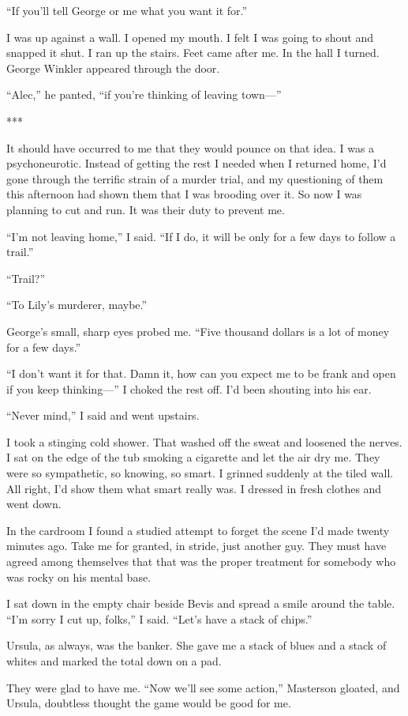 \documentclass{novel}
\begin{document}
“If you’ll tell George or me what you want it for.”

I was up against a wall. I opened my mouth. I felt I was going to shout and snapped it shut. I ran up the stairs. Feet came after me. In the hall I turned. George Winkler appeared through the door.

“Alec,” he panted, “if you’re thinking of leaving town—”

***

It should have occurred to me that they would pounce on that idea. I was a psychoneurotic. Instead of getting the rest I needed when I returned home, I’d gone through the terrific strain of a murder trial, and my questioning of them this afternoon had shown them that I was brooding over it. So now I was planning to cut and run. It was their duty to prevent me.

“I’m not leaving home,” I said. “If I do, it will be only for a few days to follow a trail.”

“Trail?”

“To Lily’s murderer, maybe.”

George’s small, sharp eyes probed me. “Five thousand dollars is a lot of money for a few days.”

“I don’t want it for that. Damn it, how can you expect me to be frank and open if you keep thinking—” I choked the rest off. I’d been shouting into his ear.

“Never mind,” I said and went upstairs.

I took a stinging cold shower. That washed off the sweat and loosened the nerves. I sat on the edge of the tub smoking a cigarette and let the air dry me. They were so sympathetic, so knowing, so smart. I grinned suddenly at the tiled wall. All right, I’d show them what smart really was. I dressed in fresh clothes and went down.

In the cardroom I found a studied attempt to forget the scene I’d made twenty minutes ago. Take me for granted, in stride, just another guy. They must have agreed among themselves that that was the proper treatment for somebody who was rocky on his mental base.

I sat down in the empty chair beside Bevis and spread a smile around the table. “I’m sorry I cut up, folks,” I said. “Let’s have a stack of chips.”

Ursula, as always, was the banker. She gave me a stack of blues and a stack of whites and marked the total down on a pad.

They were glad to have me. “Now we’ll see some action,” Masterson gloated, and Ursula, doubtless thought the game would be good for me.
\end{document}
